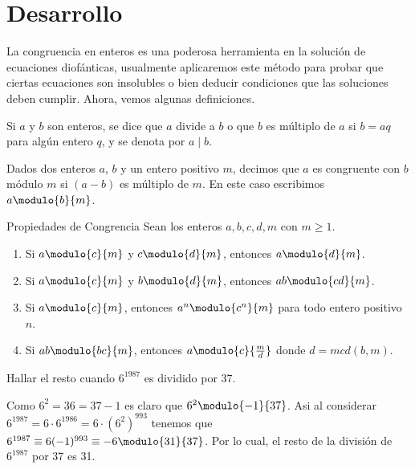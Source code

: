\section{Desarrollo}

La congruencia en enteros es una poderosa herramienta en la solución de ecuaciones diofánticas, usualmente aplicaremos
este método para probar que ciertas ecuaciones son insolubles o bien deducir condiciones que las soluciones deben cumplir.
Ahora, vemos algunas definiciones.

\begin{definition}[Divisibilidad]
    Si $a$ y $b$ son enteros, se dice que $a$ divide a $b$ o que $b$ es múltiplo de $a$ si $b = aq$ para algún entero $q$,
    y se denota por $a \mid b$.
\end{definition}

\begin{definition}[Congruencias]
    Dados dos enteros $a$, $b$ y un entero positivo $m$, decimos que $a$ es congruente con $b$ módulo $m$ si $(a - b)$ es múltiplo de $m$.
    En este caso escribimos $a \modulo{b}{m}$.
\end{definition}

\begin{theorem.box}{Propiedades de Congrencia}{}
    Sean los enteros $a,b,c,d,m$ con $m \geq 1$.
    \begin{enumerate}
        \item Si $a \modulo{c}{m}$ y $c \modulo{d}{m}$, entonces $a \modulo{d}{m}$.
        \item Si $a \modulo{c}{m}$ y $b \modulo{d}{m}$, entonces $ab \modulo{cd}{m}$.
        \item Si $a \modulo{c}{m}$, entonces $a^n \modulo{c^n}{m}$ para todo entero positivo $n$.
        \item Si $ab \modulo{bc}{m}$, entonces $a \modulo{c}{\frac{m}{d}}$ donde $d = mcd(b,m)$.
    \end{enumerate}
\end{theorem.box}

\begin{example}
    Hallar el resto cuando $6^{1987}$ es dividido por 37.
\end{example}
\begin{solution}
    Como $6^2 = 36 = 37 - 1$ es claro que $6^2 \modulo{-1}{37}$.
    Asi al considerar $6^{1987} = 6\cdot 6^{1986} = 6\cdot (6^2)^{993}$ tenemos que $6^{1987} \equiv 6(-1)^{993} \equiv -6 \modulo{31}{37}$.
    Por lo cual, el resto de la división de $6^{1987}$ por 37 es 31.
\end{solution}


